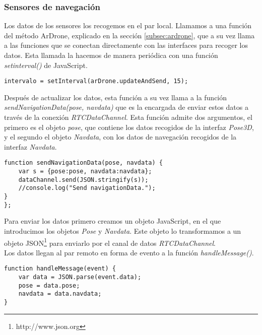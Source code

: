 \subsubsection{Sensores de navegación}

Los datos de los sensores los recogemos en el par local. Llamamos a una función del método ArDrone, explicado en la sección \ref{subsec:ardrone}, que a su vez llama a las funciones que se conectan directamente con las interfaces para recoger los datos. Esta llamada la hacemos de manera periódica con una función \emph{setinterval()} de JavaScript.\\

\begin{lstlisting}[caption=Intervalo actualización y envío de datos de los sensores.]
intervalo = setInterval(arDrone.updateAndSend, 15);
\end{lstlisting}

Después de actualizar los datos, esta función a su vez llama a la función \emph{sendNavigationData(pose, navdata)} que es la encargada de enviar estos datos a través de la conexión \emph{RTCDataChannel}. Esta función admite dos argumentos, el primero es el objeto \emph{pose}, que contiene los datos recogidos de la interfaz \emph{Pose3D}, y el segundo el objeto \emph{Navdata}, con los datos de navegación recogidos de la interfaz \emph{Navdata}.\\

\begin{lstlisting}[caption=Envio de los datos de los sensores en el par local.]
function sendNavigationData(pose, navdata) {
	var s = {pose:pose, navdata:navdata};
	dataChannel.send(JSON.stringify(s));
	//console.log("Send navigationData.");
}
};\end{lstlisting}

Para enviar los datos primero creamos un objeto JavaScript, en el que introducimos los objetos \emph{Pose} y \emph{Navdata}. Este objeto lo transformamos a un objeto JSON\footnote{http://www.json.org} para enviarlo por el canal de datos \emph{RTCDataChannel}.\\

Los datos llegan al par remoto en forma de evento a la función \emph{handleMessage()}.\\

\begin{lstlisting}[caption=Manejo de los datos de los sensores en el par remoto.]
function handleMessage(event) {
    var data = JSON.parse(event.data);
    pose = data.pose;
    navdata = data.navdata;
}
\end{lstlisting}

